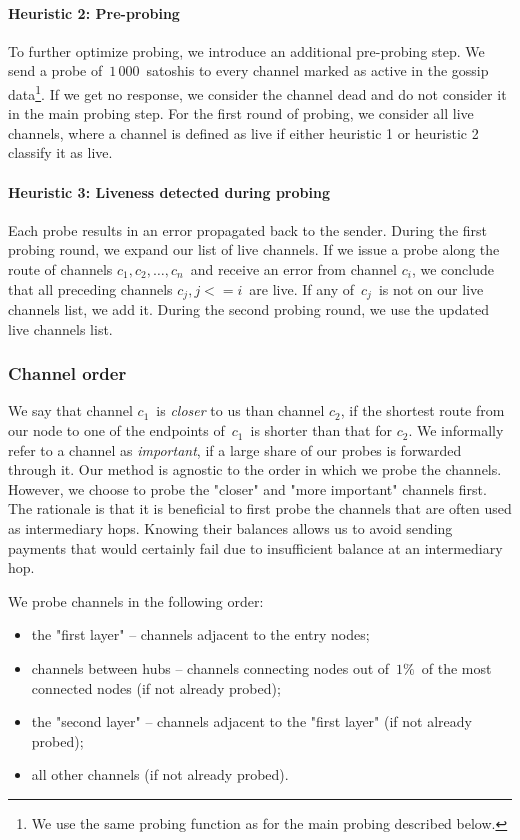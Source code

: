 \paragraph{Heuristic 2: Pre-probing}
To further optimize probing, we introduce an additional pre-probing step.
We send a probe of~$1\,000$~satoshis to every channel marked as active in the gossip data\footnote{We use the same probing function as for the main probing described below.}.
If we get no response, we consider the channel dead and do not consider it in the main probing step.
For the first round of probing, we consider all live channels, where a channel is defined as live if either heuristic 1 or heuristic 2 classify it as live.

\paragraph{Heuristic 3: Liveness detected during probing}
Each probe results in an error propagated back to the sender.
During the first probing round, we expand our list of live channels.
If we issue a probe along the route of channels $c_1, c_2, \dots, c_n$~and receive an error from channel $c_i$, we conclude that all preceding channels $c_j, j<=i$~are live.
If any of~$c_j$~is not on our live channels list, we add it.
During the second probing round, we use the updated live channels list.


\subsubsection*{Channel order}
We say that channel $c_1$~is \textit{closer} to us than channel $c_2$, if the shortest route from our node to one of the endpoints of~$c_1$~is shorter than that for $c_2$.
We informally refer to a channel as \textit{important}, if a large share of our probes is forwarded through it.
Our method is agnostic to the order in which we probe the channels.
However, we choose to probe the "closer" and "more important" channels first.
The rationale is that it is beneficial to first probe the channels that are often used as intermediary hops.
Knowing their balances allows us to avoid sending payments that would certainly fail due to insufficient balance at an intermediary hop.

We probe channels in the following order:

\begin{itemize}
	\item the "first layer" -- channels adjacent to the entry nodes;
	\item channels between hubs -- channels connecting nodes out of~$1\%$~of the most connected nodes (if not already probed);
	\item the "second layer" -- channels adjacent to the "first layer" (if not already probed);
	\item all other channels (if not already probed).
\end{itemize}


